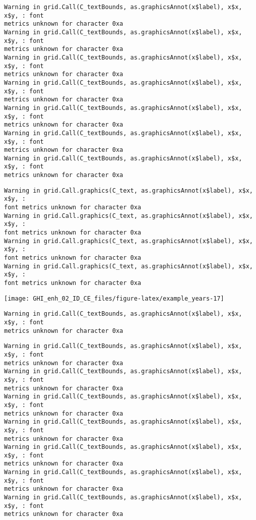 \documentclass[
  10pt,
  a4paper,oneside]{article}
\begin{document}
\begin{verbatim}
Warning in grid.Call(C_textBounds, as.graphicsAnnot(x$label), x$x, x$y, : font
metrics unknown for character 0xa
Warning in grid.Call(C_textBounds, as.graphicsAnnot(x$label), x$x, x$y, : font
metrics unknown for character 0xa
Warning in grid.Call(C_textBounds, as.graphicsAnnot(x$label), x$x, x$y, : font
metrics unknown for character 0xa
Warning in grid.Call(C_textBounds, as.graphicsAnnot(x$label), x$x, x$y, : font
metrics unknown for character 0xa
Warning in grid.Call(C_textBounds, as.graphicsAnnot(x$label), x$x, x$y, : font
metrics unknown for character 0xa
Warning in grid.Call(C_textBounds, as.graphicsAnnot(x$label), x$x, x$y, : font
metrics unknown for character 0xa
Warning in grid.Call(C_textBounds, as.graphicsAnnot(x$label), x$x, x$y, : font
metrics unknown for character 0xa
\end{verbatim}

\begin{verbatim}
Warning in grid.Call.graphics(C_text, as.graphicsAnnot(x$label), x$x, x$y, :
font metrics unknown for character 0xa
Warning in grid.Call.graphics(C_text, as.graphicsAnnot(x$label), x$x, x$y, :
font metrics unknown for character 0xa
Warning in grid.Call.graphics(C_text, as.graphicsAnnot(x$label), x$x, x$y, :
font metrics unknown for character 0xa
Warning in grid.Call.graphics(C_text, as.graphicsAnnot(x$label), x$x, x$y, :
font metrics unknown for character 0xa
\end{verbatim}

\begin{center}\texttt{[image: GHI\_enh\_02\_ID\_CE\_files/figure-latex/example\_years-17]} \end{center}

\begin{verbatim}
Warning in grid.Call(C_textBounds, as.graphicsAnnot(x$label), x$x, x$y, : font
metrics unknown for character 0xa
\end{verbatim}

\begin{verbatim}
Warning in grid.Call(C_textBounds, as.graphicsAnnot(x$label), x$x, x$y, : font
metrics unknown for character 0xa
Warning in grid.Call(C_textBounds, as.graphicsAnnot(x$label), x$x, x$y, : font
metrics unknown for character 0xa
Warning in grid.Call(C_textBounds, as.graphicsAnnot(x$label), x$x, x$y, : font
metrics unknown for character 0xa
Warning in grid.Call(C_textBounds, as.graphicsAnnot(x$label), x$x, x$y, : font
metrics unknown for character 0xa
Warning in grid.Call(C_textBounds, as.graphicsAnnot(x$label), x$x, x$y, : font
metrics unknown for character 0xa
Warning in grid.Call(C_textBounds, as.graphicsAnnot(x$label), x$x, x$y, : font
metrics unknown for character 0xa
Warning in grid.Call(C_textBounds, as.graphicsAnnot(x$label), x$x, x$y, : font
metrics unknown for character 0xa
\end{verbatim}
\end{document}
